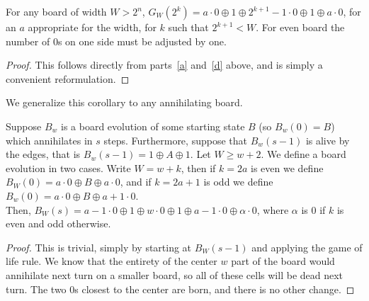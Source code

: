 \documentclass[12pt,letterpaper]{article}
\begin{document}
\begin{cor}\label{SingleWallPairPow2}
  For any board of width $W>2^n$, $G_W(2^k)=a\cdot 0\oplus 1\oplus 2^{k+1}-1\cdot 0\oplus 1\oplus a\cdot 0$, for an $a$ appropriate for the width, for $k$ such that $2^{k+1}<W$. For even board the number of 0s on one side must be adjusted by one.
\end{cor}
\begin{proof}
  This follows directly from parts~\ref{a} and~\ref{d} above, and is simply a convenient reformulation.
\end{proof}

We generalize this corollary to any annihilating board.
\begin{prop}\label{PostAnnihilation}
  Suppose $B_w$ is a board evolution of some starting state $B$ (so $B_w(0)=B$) which annihilates in $s$ steps. Furthermore, suppose that $B_w(s-1)$ is alive by the edges, that is $B_w(s-1)=1\oplus A\oplus 1$. Let $W\geq w+2$. We define a board evolution in two cases. Write $W=w+k$, then if $k=2a$ is even we define $B_W(0)=a\cdot 0 \oplus B\oplus a\cdot 0$, and if $k=2a+1$ is odd we define $B_w(0)=a\cdot 0\oplus B\oplus a+1\cdot 0$. \\
  Then, $B_W(s)=a-1\cdot 0\oplus 1\oplus w\cdot 0\oplus 1\oplus a-1\cdot 0\oplus \alpha\cdot 0$, where $\alpha$ is 0 if $k$ is even and odd otherwise.
\end{prop}
\begin{proof}
  This is trivial, simply by starting at $B_W(s-1)$ and applying the game of life rule. We know that the entirety of the center $w$ part of the board would annihilate next turn on a smaller board, so all of these cells will be dead next turn. The two 0s closest to the center are born, and there is no other change.
\end{proof}
\end{document}

